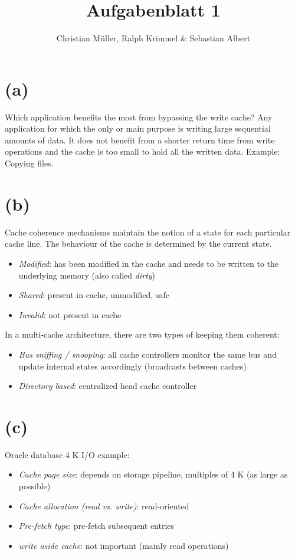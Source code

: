 \documentclass{article}
\begin{document}
\title{Aufgabenblatt 1}
\author{Christian Müller, Ralph Krimmel \& Sebastian Albert }
\maketitle
\section*{(a)}
Which application benefits the most from bypassing the write cache? Any application for which the only or main purpose is writing large sequential amounts of data. It does not benefit from a shorter return time from write operations and the cache is too small to hold all the written data. Example: Copying files.
\section*{(b)}
Cache coherence mechanisms maintain the notion of a state for each particular cache line. The behaviour of the cache is determined by the current state.
\begin{itemize}
\item \emph{Modified}: has been modified in the cache and needs to be written to the underlying memory (also called \emph{dirty})
\item \emph{Shared}: present in cache, unmodified, safe
\item \emph{Invalid}: not present in cache
\end{itemize}
In a multi-cache architecture, there are two types of keeping them coherent:
\begin{itemize}
\item \emph{Bus sniffing / snooping}: all cache controllers monitor the same bus and update internal states accordingly (broadcasts between caches)
\item \emph{Directory based}: centralized head cache controller
\end{itemize}
\section*{(c)}
Oracle database 4 K I/O example:
\begin{itemize}
\item \emph{Cache page size}: depends on storage pipeline, multiples of 4 K (as large as possible)
\item \emph{Cache allocation (read vs. write)}: read-oriented
\item \emph{Pre-fetch type}: pre-fetch subsequent entries
\item \emph{write aside cache}: not important (mainly read operations)
\end{itemize}
\end{document}
